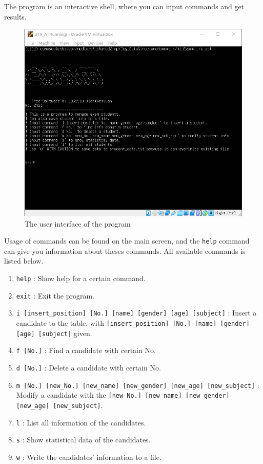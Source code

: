 \documentclass[cn,black,12pt,normal]{elegantnote}
\begin{document}
The program is an interactive shell, where you can input commands and get results.

\begin{figure}[H]
    \centering
    \includegraphics[width=0.7\linewidth]{image/exam_01.jpg}
    \caption{The user interface of the program}
\end{figure}

Usage of commands can be found on the main screen, and the \lstinline{help} command can give you information about theses commands.  All available commands is listed below.

\begin{enumerate}
    \item \lstinline{help} : Show help for a certain command.
    \item \lstinline{exit} : Exit the program.
    \item \lstinline{i [insert_position] [No.] [name] [gender] [age] [subject]} : Insert a candidate to the table, with \lstinline{[insert_position] [No.] [name] [gender] [age] [subject]} given.
    \item \lstinline{f [No.]} : Find a candidate with certain No.
    \item \lstinline{d [No.]} : Delete a candidate with certain No.
    \item \lstinline{m [No.] [new_No.] [new_name] [new_gender] [new_age] [new_subject]} : Modify a candidate with the \lstinline{[new_No.] [new_name] [new_gender] [new_age] [new_subject]}.
    \item \lstinline{l} : List all information of the candidates.
    \item \lstinline{s} : Show statistical data of the candidates.
    \item \lstinline{w} : Write the candidates' information to a file.
\end{enumerate}
\end{document}
